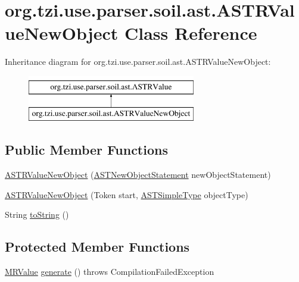 \hypertarget{classorg_1_1tzi_1_1use_1_1parser_1_1soil_1_1ast_1_1_a_s_t_r_value_new_object}{\section{org.\-tzi.\-use.\-parser.\-soil.\-ast.\-A\-S\-T\-R\-Value\-New\-Object Class Reference}
\label{classorg_1_1tzi_1_1use_1_1parser_1_1soil_1_1ast_1_1_a_s_t_r_value_new_object}
}
Inheritance diagram for org.\-tzi.\-use.\-parser.\-soil.\-ast.\-A\-S\-T\-R\-Value\-New\-Object\-:\begin{figure}[H]
\begin{center}
\leavevmode
\includegraphics[height=2.000000cm]{classorg_1_1tzi_1_1use_1_1parser_1_1soil_1_1ast_1_1_a_s_t_r_value_new_object}
\end{center}
\end{figure}
\subsection*{Public Member Functions}
\begin{DoxyCompactItemize}
\item 
\hyperlink{classorg_1_1tzi_1_1use_1_1parser_1_1soil_1_1ast_1_1_a_s_t_r_value_new_object_ad7a68497ea5c397c4cd2a6ea76574649}{A\-S\-T\-R\-Value\-New\-Object} (\hyperlink{classorg_1_1tzi_1_1use_1_1parser_1_1soil_1_1ast_1_1_a_s_t_new_object_statement}{A\-S\-T\-New\-Object\-Statement} new\-Object\-Statement)
\item 
\hyperlink{classorg_1_1tzi_1_1use_1_1parser_1_1soil_1_1ast_1_1_a_s_t_r_value_new_object_a491991df0b40d9cab998be356fe4787c}{A\-S\-T\-R\-Value\-New\-Object} (Token start, \hyperlink{classorg_1_1tzi_1_1use_1_1parser_1_1ocl_1_1_a_s_t_simple_type}{A\-S\-T\-Simple\-Type} object\-Type)
\item 
String \hyperlink{classorg_1_1tzi_1_1use_1_1parser_1_1soil_1_1ast_1_1_a_s_t_r_value_new_object_ae02896c2334f3f29c8cbe22dee65375f}{to\-String} ()
\end{DoxyCompactItemize}
\subsection*{Protected Member Functions}
\begin{DoxyCompactItemize}
\item 
\hyperlink{classorg_1_1tzi_1_1use_1_1uml_1_1sys_1_1soil_1_1_m_r_value}{M\-R\-Value} \hyperlink{classorg_1_1tzi_1_1use_1_1parser_1_1soil_1_1ast_1_1_a_s_t_r_value_new_object_aab1ec56b9fe7d183dd57607493e58515}{generate} ()  throws Compilation\-Failed\-Exception 
\end{DoxyCompactItemize}
